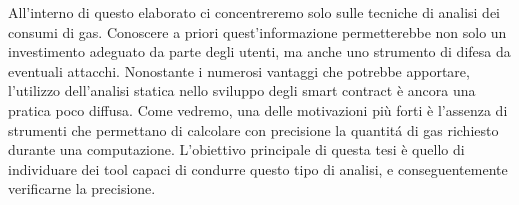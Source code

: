 \indent All'interno di questo elaborato ci concentreremo solo sulle tecniche di analisi dei consumi di gas. Conoscere a priori quest'informazione permetterebbe non solo un investimento adeguato da parte degli utenti, ma anche uno strumento di difesa da eventuali attacchi. Nonostante i numerosi vantaggi che potrebbe apportare, l'utilizzo dell'analisi statica nello sviluppo degli smart contract è ancora una pratica poco diffusa. Come vedremo, una delle motivazioni più forti è l'assenza di strumenti che permettano di calcolare con precisione la quantitá di gas richiesto durante una computazione. L'obiettivo principale di questa tesi è quello di individuare dei tool capaci di condurre questo tipo di analisi, e conseguentemente verificarne la precisione.\newline
